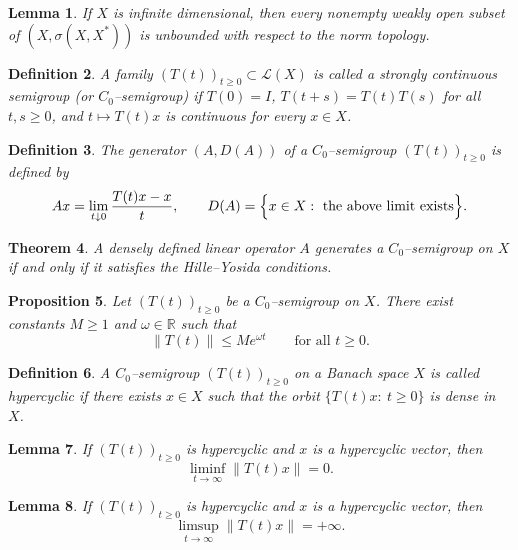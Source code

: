 \documentclass[12pt]{article}
\newtheorem{theorem}{Theorem}[section]
\newtheorem{lemma}[theorem]{Lemma}
\newtheorem{proposition}[theorem]{Proposition}
\newtheorem{definition}[theorem]{Definition}
\begin{document}
\begin{lemma}\cite{Brezis2011}
If $X$ is infinite dimensional, then every nonempty weakly open subset of $(X,\sigma(X,X^\ast))$ is unbounded with respect to the norm topology.
\end{lemma}


\begin{definition}\cite{Pazy1983}
A family $(T(t))_{t\ge0}\subset\mathcal{L}(X)$ is called a
\emph{strongly continuous semigroup} (or $C_0$--semigroup) if
$T(0)=I$, $T(t+s)=T(t)T(s)$ for all $t,s\ge0$, and
$t\mapsto T(t)x$ is continuous for every $x\in X$.
\end{definition}

\begin{definition}\cite{Pazy1983}
The \emph{generator} $(A,D(A))$ of a $C_0$--semigroup $(T(t))_{t\ge0}$ is defined by
\[
Ax=\lim_{t\downarrow0}\frac{T(t)x-x}{t},
\qquad
D(A)=\Bigl\{x\in X:\ \text{the above limit exists}\Bigr\}.
\]
\end{definition}

\begin{theorem}\cite{Pazy1983,EngelNagel2000}
A densely defined linear operator $A$ generates a $C_0$--semigroup on $X$ if and only if it satisfies the Hille--Yosida conditions.
\end{theorem}

\begin{proposition}\cite{EngelNagel2000}
Let $(T(t))_{t\ge0}$ be a $C_0$--semigroup on $X$. There exist constants $M\ge1$ and $\omega\in\mathbb{R}$ such that
\[
\|T(t)\|\le M e^{\omega t}
\qquad \text{for all } t\ge0.
\]
\end{proposition}


\begin{definition}\cite{BayartMatheron2009}
A $C_0$--semigroup $(T(t))_{t\ge0}$ on a Banach space $X$ is called \emph{hypercyclic} if there exists $x\in X$ such that the orbit $\{T(t)x:\ t\ge0\}$ is dense in $X$.
\end{definition}

\begin{lemma}\cite{BayartMatheron2009}
If $(T(t))_{t\ge0}$ is hypercyclic and $x$ is a hypercyclic vector, then
\[
\liminf_{t\to\infty}\|T(t)x\|=0.
\]
\end{lemma}

\begin{lemma}\cite{BayartMatheron2009}
If $(T(t))_{t\ge0}$ is hypercyclic and $x$ is a hypercyclic vector, then
\[
\limsup_{t\to\infty}\|T(t)x\|=+\infty.
\]
\end{lemma}
\end{document}
